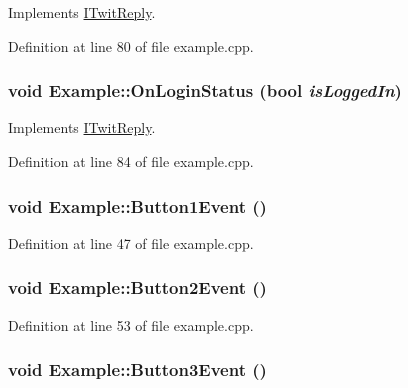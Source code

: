 Implements \hyperlink{classITwitReply_9011b418bb62f734a2e3cd447815ec90}{ITwitReply}.

Definition at line 80 of file example.cpp.\hypertarget{classExample_491e8add0ddfeca10f367f5904e232be}{
\subsubsection{\setlength{\rightskip}{0pt plus 5cm}void Example::OnLoginStatus (bool {\em isLoggedIn})}}
\label{classExample_491e8add0ddfeca10f367f5904e232be}




Implements \hyperlink{classITwitReply_691e9bcbe06bd66233b1c870d2e4d67d}{ITwitReply}.

Definition at line 84 of file example.cpp.\hypertarget{classExample_f30ef7aa301f3797db9500d8043dffeb}{
\subsubsection{\setlength{\rightskip}{0pt plus 5cm}void Example::Button1Event ()}}
\label{classExample_f30ef7aa301f3797db9500d8043dffeb}




Definition at line 47 of file example.cpp.\hypertarget{classExample_77c79d81f5e12da40a5f2951025ec77e}{
\subsubsection{\setlength{\rightskip}{0pt plus 5cm}void Example::Button2Event ()}}
\label{classExample_77c79d81f5e12da40a5f2951025ec77e}




Definition at line 53 of file example.cpp.\hypertarget{classExample_f41c426d8b701d076980cf2a897a1d5e}{
\subsubsection{\setlength{\rightskip}{0pt plus 5cm}void Example::Button3Event ()}}
\label{classExample_f41c426d8b701d076980cf2a897a1d5e}




